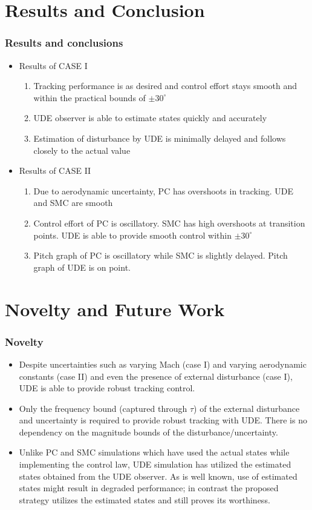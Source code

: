 \documentclass[table,10pt,red]{beamer}	%
\begin{document}
\section{Results and Conclusion}
\begin{frame}
	\frametitle{Results and conclusions}
	\begin{itemize}
		\item Results of CASE I
		\begin{enumerate}
			\item Tracking performance is as desired and control effort stays smooth and within the practical bounds of  $\pm30^\circ$
			\item UDE observer is able to estimate states quickly and accurately
			\item Estimation of disturbance by UDE is minimally delayed and follows closely to the actual value
		\end{enumerate}
		
		\item Results of CASE II
		\begin{enumerate}
			\item Due to aerodynamic uncertainty, PC has overshoots in tracking. UDE and SMC are smooth 
			\item Control effort of PC is oscillatory. SMC has high overshoots at transition points. UDE is able to provide smooth control within $\pm 30^\circ$
			\item Pitch graph of PC is oscillatory while SMC is slightly delayed. Pitch graph of UDE is on point.
		\end{enumerate}
	\end{itemize}	
	
\end{frame}

\section{Novelty and Future Work}
\begin{frame}
	\frametitle{Novelty}
	\begin{itemize}
		\item Despite uncertainties such as varying Mach (case I) and varying aerodynamic constants (case II) and even the presence of external disturbance (case I), UDE is able to provide robust tracking control.
		\bigskip
		
		\item Only the frequency bound (captured through $\tau$) of the external disturbance and uncertainty is required to provide robust tracking with UDE. There is no dependency on the magnitude bounds of the disturbance/uncertainty.
		\bigskip
		
		\item Unlike PC and SMC simulations which have used the actual states while implementing the control law, UDE simulation has utilized the estimated
		states obtained from the UDE observer. As is well known, use of estimated states might result in degraded performance; in contrast the proposed strategy utilizes the estimated states and still proves its worthiness.
\end{itemize}
\end{frame}
\end{document}
